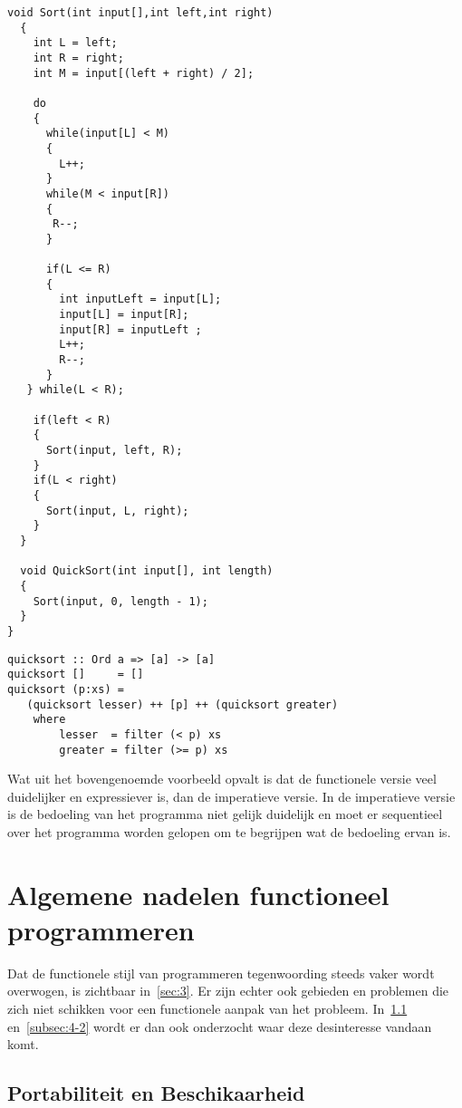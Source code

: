 \documentclass[twoside,twocolumn]{article}
\begin{document}
\begin{lstlisting}[style=CStyle]
  void Sort(int input[],int left,int right)
  {
    int L = left;
    int R = right;
    int M = input[(left + right) / 2];

    do
    {
      while(input[L] < M)
      {
        L++;
      }
      while(M < input[R])
      {
       R--;
      }

      if(L <= R)
      {
        int inputLeft = input[L];
        input[L] = input[R];
        input[R] = inputLeft ;
        L++;
        R--;
      }
   } while(L < R);

    if(left < R)
    {
      Sort(input, left, R);
    }
    if(L < right)
    {
      Sort(input, L, right);
    }
  }

  void QuickSort(int input[], int length)
  {
    Sort(input, 0, length - 1);
  }
}
\end{lstlisting}

\begin{lstlisting}[style=HsStyle]
quicksort :: Ord a => [a] -> [a]
quicksort []     = []
quicksort (p:xs) =
   (quicksort lesser) ++ [p] ++ (quicksort greater)
    where
        lesser  = filter (< p) xs
        greater = filter (>= p) xs
\end{lstlisting}

Wat uit het bovengenoemde voorbeeld opvalt is dat de functionele versie veel
duidelijker en expressiever is, dan de imperatieve versie. In de imperatieve
versie is de bedoeling van het programma niet gelijk duidelijk en moet er
sequentieel over het programma worden gelopen om te begrijpen wat de bedoeling
ervan is.


\section{Algemene nadelen functioneel programmeren}
\label{sec:4}

Dat de functionele stijl van programmeren tegenwoording steeds vaker wordt
overwogen, is zichtbaar in~\cref{sec:3}. Er zijn echter ook gebieden en
problemen die zich niet schikken voor een functionele aanpak van het probleem.
In~\cref{subsec:4-1} en~\cref{subsec:4-2} wordt er dan ook onderzocht waar deze
desinteresse vandaan komt.

\subsection{Portabiliteit en Beschikaarheid}
\label{subsec:4-1}
\end{document}
